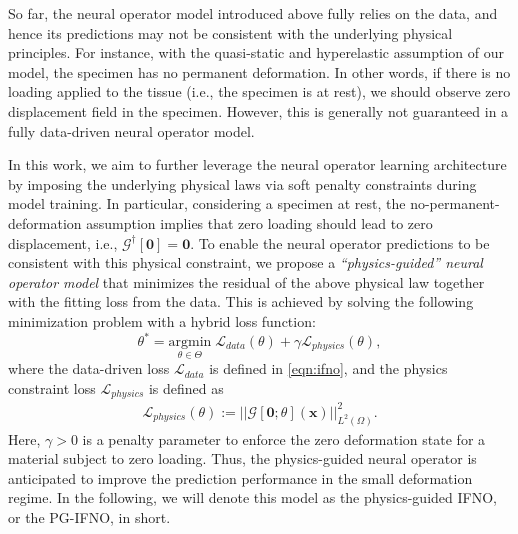 \documentclass[twocolumn,10pt]{asme2ej}
\renewcommand{\~}{\tilde}
\renewcommand{\-}{\bar}
\newcommand{\8}{\infty}
\numberwithin{equation}{section}
\newcommand{\mcG}{\mathcal{G}}
\newcommand{\mcL}{\mathcal{L}}
\def\omg{{\Omega}}
\def \ub{\bm{u}}
\def \xb{\bm{x}}
\newcommand{\vertii}[1]{{\left\vert\left\vert #1
    \right\vert\right\vert}}
\begin{document}
So far, the neural operator model introduced above fully relies on the data, and hence its predictions may not be consistent with the underlying physical principles. For instance, with the quasi-static and hyperelastic assumption of our model, the specimen has no permanent deformation. In other words, if there is no loading applied to the tissue (i.e., the specimen is at rest), we should observe zero displacement field in the specimen. However, this is generally not guaranteed in a fully data-driven neural operator model.


In this work, we aim to further leverage the neural operator learning architecture by imposing the underlying physical laws via soft penalty constraints during model training. In particular, considering a specimen at rest, the no-permanent-deformation assumption implies that zero loading should lead to zero displacement, i.e., $\mcG^\dag[\mathbf{0}]=\mathbf{0}$. To enable the neural operator predictions to be consistent with this physical constraint, we propose a {\it ``physics-guided'' neural operator model} that minimizes the residual of the above physical law together with the fitting loss from the data. This is achieved by solving the following minimization problem with a hybrid loss function: 
\begin{equation}\label{eqn:pgifno}
\theta^*=\underset{\theta\in\Theta}{\text{argmin}}\;\mcL_{data}(\theta)+\gamma \mcL_{physics}(\theta),
\end{equation}
where the data-driven loss $\mcL_{data}$ is defined in \eqref{eqn:ifno}, and the physics constraint loss $\mcL_{physics}$ is defined as
\begin{align}\label{eqn:opt_pi}
\mcL_{physics}(\theta):=\vertii{\mcG[\mathbf{0};\theta](\xb)}_{L^2(\omg)}^2.
\end{align}
Here, $\gamma>0$ is a penalty parameter to enforce the zero deformation state for a material subject to zero loading. Thus, the physics-guided neural operator is anticipated to improve the prediction performance in the small deformation regime. 
In the following, we will denote this model as the physics-guided IFNO, or the PG-IFNO, in short.
    
\end{document}

